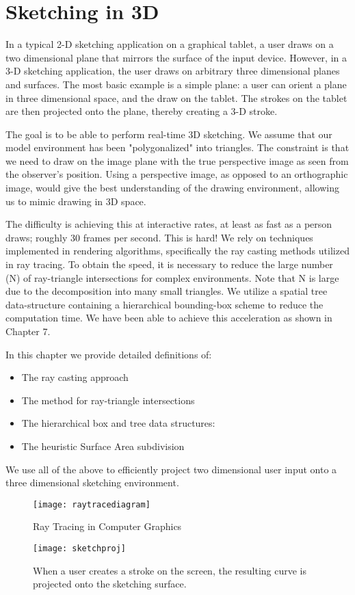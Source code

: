 \chapter{Sketching in 3D}

In a typical 2-D sketching application on a graphical tablet, a user draws on a two dimensional plane that mirrors the surface of the input device.
However, in a 3-D sketching application, the user draws on arbitrary three dimensional planes and surfaces.
The most basic example is a simple plane: a user can orient a plane in three dimensional space, and the draw on the tablet.
The strokes on the tablet are then projected onto the plane, thereby creating a 3-D stroke.

The goal is to be able to perform real-time 3D sketching.
We assume that our model environment has been "polygonalized" into triangles.
The constraint is that we need to draw on the image plane with the true perspective image as seen from the observer's position.
Using a perspective image, as opposed to an orthographic image, would give the best understanding of the drawing environment, allowing us to mimic drawing in 3D space.

The difficulty is achieving this at interactive rates, at least as fast as a person draws; roughly 30 frames per second.
This is hard!
We rely on techniques implemented in rendering algorithms, specifically the ray casting methods utilized in ray tracing.
To obtain the speed, it is necessary to reduce the large number (N) of ray-triangle intersections for complex environments. Note that N is large due to the decomposition into many small triangles.
We utilize a spatial tree data-structure containing a hierarchical bounding-box scheme to reduce the computation time. We have been able to achieve this acceleration as shown in Chapter 7. 

In this chapter we provide detailed definitions of:
\begin{itemize}
\item The ray casting approach
\item The method for ray-triangle intersections
\item The hierarchical box and tree data structures:
\item The heuristic Surface Area subdivision
\end{itemize}  
We use all of the above to efficiently project two dimensional user input onto a three dimensional sketching environment.

\begin{figure}
\texttt{[image: raytracediagram]}
\caption{Ray Tracing in Computer Graphics}
\end{figure} 
\begin{figure}
\texttt{[image: sketchproj]}
\caption[Projecting a Stroke onto the Sketching Surface]{When a user creates a stroke on the screen, the resulting curve is projected onto the sketching surface.}
\end{figure} 

